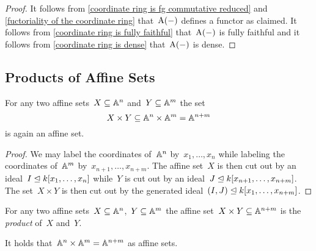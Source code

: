 \begin{proof}
  It follows from \cref{coordinate ring is fg commutative reduced} and \cref{fuctoriality of the coordinate ring} that~$\operatorname{A}(-)$ defines a functor as claimed.
  It follows from \cref{coordinate ring is fully faithful} that~$\operatorname{A}(-)$ is fully faithful and it follows from \cref{coordinate ring is dense} that~$\operatorname{A}(-)$ is dense.
\end{proof}





\subsection{Products of Affine Sets}


\begin{lemma}
  \label{product of affine sets is an affine set}
  For any two affine sets~$X \subseteq \mathbb{A}^n$ and~$Y \subseteq \mathbb{A}^m$ the set
  \[
              X \times Y
    \subseteq \mathbb{A}^n \times \mathbb{A}^m
    =         \mathbb{A}^{n+m}
  \]
  is again an affine set.
\end{lemma}


\begin{proof}
  We may label the coordinates of~$\mathbb{A}^n$ by~$x_1, \dotsc, x_n$ while labeling the coordinates of~$\mathbb{A}^m$ by~$x_{n+1}, \dotsc, x_{n+m}$.
  The affine set~$X$ is then cut out by an ideal~$I \trianglelefteq k[x_1, \dotsc, x_n]$ while~$Y$ is cut out by an ideal~$J \trianglelefteq k[x_{n+1}, \dotsc, x_{n+m}]$.
  The set~$X \times Y$ is then cut out by the generated ideal~$(I,J) \trianglelefteq k[x_1, \dotsc, x_{n+m}]$.
\end{proof}


\begin{definition}
  For any two affine sets~$X \subseteq \mathbb{A}^n$,~$Y \subseteq \mathbb{A}^m$ the affine set~$X \times Y \subseteq \mathbb{A}^{n+m}$ is the \emph{product} of~$X$ and~$Y$.
\end{definition}


\begin{example}
  It holds that~$\mathbb{A}^n \times \mathbb{A}^m = \mathbb{A}^{n+m}$ as affine sets.
\end{example}


